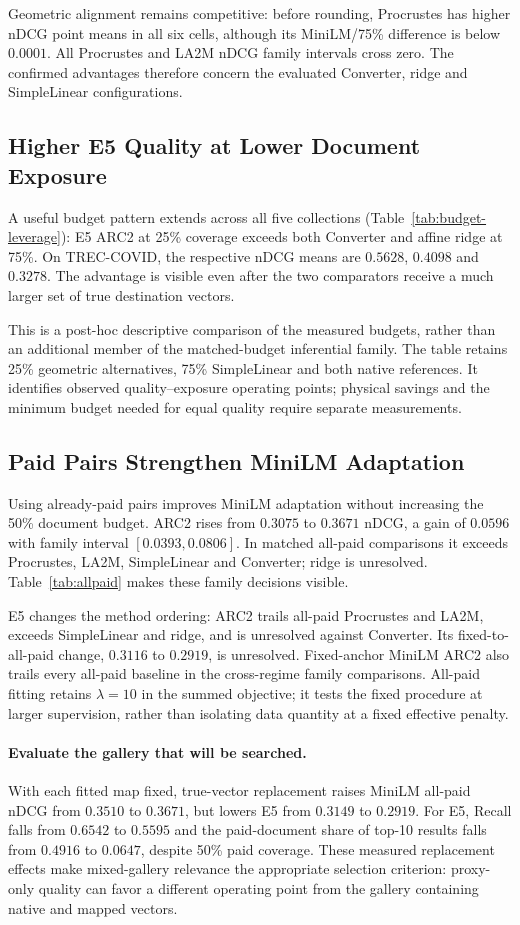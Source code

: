 Geometric alignment remains competitive: before rounding, Procrustes has
higher nDCG point means in all six cells, although its MiniLM/75\% difference
is below $0.0001$. All Procrustes and LA2M nDCG family intervals cross zero.
The confirmed advantages therefore concern the evaluated Converter, ridge
and SimpleLinear configurations.

\subsection{Higher E5 Quality at Lower Document Exposure}

A useful budget pattern extends across all five collections
(Table~\ref{tab:budget-leverage}): E5 ARC2 at 25\% coverage exceeds both
Converter and affine ridge at 75\%. On TREC-COVID, the respective nDCG means
are $0.5628$, $0.4098$ and $0.3278$. The advantage is visible even after the
two comparators receive a much larger set of true destination vectors.

This is a post-hoc descriptive comparison of the measured budgets, rather
than an additional member of the matched-budget inferential family. The table
retains 25\% geometric alternatives, 75\% SimpleLinear and both native
references. It identifies observed quality--exposure operating points;
physical savings and the minimum budget needed for equal quality require
separate measurements.

\subsection{Paid Pairs Strengthen MiniLM Adaptation}

Using already-paid pairs improves MiniLM adaptation without increasing the
50\% document budget. ARC2 rises from $0.3075$ to $0.3671$ nDCG, a gain of
$0.0596$ with family interval $[0.0393,0.0806]$. In matched all-paid
comparisons it exceeds Procrustes, LA2M, SimpleLinear and Converter; ridge is
unresolved. Table~\ref{tab:allpaid} makes these family decisions visible.

E5 changes the method ordering: ARC2 trails all-paid Procrustes and LA2M,
exceeds SimpleLinear and ridge, and is unresolved against Converter. Its
fixed-to-all-paid change, $0.3116$ to $0.2919$, is unresolved. Fixed-anchor
MiniLM ARC2 also trails every all-paid baseline in the cross-regime family
comparisons. All-paid fitting retains $\lambda=10$ in the summed objective;
it tests the fixed procedure at larger supervision, rather than isolating
data quantity at a fixed effective penalty.

\paragraph{Evaluate the gallery that will be searched.}
With each fitted map fixed, true-vector replacement raises MiniLM all-paid
nDCG from $0.3510$ to $0.3671$, but lowers E5 from $0.3149$ to $0.2919$.
For E5, Recall falls from $0.6542$ to $0.5595$ and the paid-document share of
top-10 results falls from $0.4916$ to $0.0647$, despite 50\% paid coverage.
These measured replacement effects make mixed-gallery relevance the
appropriate selection criterion: proxy-only quality can favor a different
operating point from the gallery containing native and mapped vectors.
